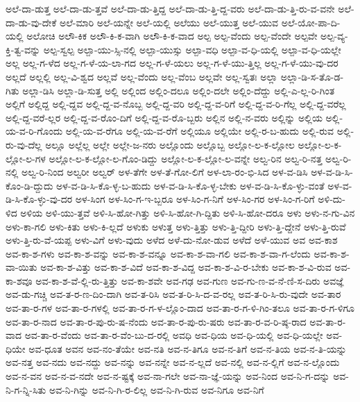 {ಅಲೆ-ದಾ-ಡುತ್ತ
ಅಲೆ-ದಾ-ಡು-ತ್ತವೆ
ಅಲೆ-ದಾ-ಡು-ತ್ತಿದ್ದ
ಅಲೆ-ದಾ-ಡು-ತ್ತಿ-ದ್ದ-ವರು
ಅಲೆ-ದಾ-ಡು-ತ್ತಿ-ರು-ವ-ವನೇ
ಅಲೆ-ದಾ-ಡು-ವು-ದೇಕೆ
ಅಲೆ-ಮಾರಿ
ಅಲೆ-ಯನ್ನೇ
ಅಲೆ-ಯಲ್ಲಿ
ಅಲೆಯು
ಅಲೆ-ಯುತ್ತ
ಅಲೆ-ಯುವ
ಅಲೆ-ಯೋ-ಪಾ-ದಿ-ಯಲ್ಲಿ
ಅಲೋಚಿ
ಅಲೌ-ಕಿಕ
ಅಲೌ-ಕಿ-ಕ-ವಾಗಿ
ಅಲೌ-ಕಿ-ಕ-ವಾದ
ಅಲ್ಪ
ಅಲ್ಪ-ವೆಂದು
ಅಲ್ಪ-ವೆಂದೇ
ಅಲ್ಪವೇ
ಅಲ್ಪ-ವ್ಯ-ಕ್ತಿ-ತ್ವ-ವನ್ನು
ಅಲ್ಪ-ಸ್ವಲ್ಪ
ಅಲ್ಪಾ-ಯು-ಸ್ಸಿ-ನಲ್ಲಿ
ಅಲ್ಪಾ-ಯುಸ್ಸು
ಅಲ್ಪಾ-ವಧಿ
ಅಲ್ಪಾ-ವ-ಧಿ-ಯಲ್ಲಿ
ಅಲ್ಪಾ-ವ-ಧಿ-ಯಲ್ಲೇ
ಅಲ್ಲ
ಅಲ್ಲ-ಗ-ಳೆದ
ಅಲ್ಲ-ಗ-ಳೆ-ಯ-ಲಾ-ಗದ
ಅಲ್ಲ-ಗ-ಳೆ-ಯಲು
ಅಲ್ಲ-ಗ-ಳೆ-ಯು-ತ್ತಿಲ್ಲ
ಅಲ್ಲ-ಗ-ಳೆ-ಯು-ವು-ದರ
ಅಲ್ಲದೆ
ಅಲ್ಲಲ್ಲಿ
ಅಲ್ಲ-ವಿ-ಶ್ವದ
ಅಲ್ಲವೆ
ಅಲ್ಲ-ವೆಂದು
ಅಲ್ಲ-ವೆಂಬ
ಅಲ್ಲವೇ
ಅಲ್ಲ-ಸ್ವತಃ
ಅಲ್ಲಾ
ಅಲ್ಲಾ-ಡಿ-ಸ-ತೊ-ಡ-ಗಿತು
ಅಲ್ಲಾ-ಡಿಸಿ
ಅಲ್ಲಾ-ಡಿ-ಸುತ್ತ
ಅಲ್ಲಿ
ಅಲ್ಲಿಂದ
ಅಲ್ಲಿಂ-ದಲೂ
ಅಲ್ಲಿಂ-ದಲೇ
ಅಲ್ಲಿಂ-ದೆದ್ದು
ಅಲ್ಲಿ-ಎ-ಲ್ಲ-ರಿ-ಗಿಂತ
ಅಲ್ಲಿಗೆ
ಅಲ್ಲಿದ್ದ
ಅಲ್ಲಿ-ದ್ದವ
ಅಲ್ಲಿ-ದ್ದ-ವ-ನೊಬ್ಬ
ಅಲ್ಲಿ-ದ್ದ-ವರಿ
ಅಲ್ಲಿ-ದ್ದ-ವ-ರಿಗೆ
ಅಲ್ಲಿ-ದ್ದ-ವ-ರಿ-ಗೆಲ್ಲ
ಅಲ್ಲಿ-ದ್ದ-ವರೆಲ್ಲ
ಅಲ್ಲಿ-ದ್ದ-ವರೆ-ಲ್ಲರ
ಅಲ್ಲಿ-ದ್ದ-ವ-ರೊಂ-ದಿಗೆ
ಅಲ್ಲಿ-ದ್ದ-ವ-ರೊ-ಬ್ಬರು
ಅಲ್ಲಿನ
ಅಲ್ಲಿ-ನ-ವರು
ಅಲ್ಲಿನ್ನು
ಅಲ್ಲಿಯ
ಅಲ್ಲಿ-ಯ-ವ-ರಿ-ಗೊಂದು
ಅಲ್ಲಿ-ಯ-ವ-ರೆಗೂ
ಅಲ್ಲಿ-ಯ-ವ-ರೆಗೆ
ಅಲ್ಲಿಯೂ
ಅಲ್ಲಿಯೇ
ಅಲ್ಲಿ-ರ-ಬ-ಹುದು
ಅಲ್ಲಿ-ರುವ
ಅಲ್ಲಿ-ರು-ವು-ದೆಲ್ಲ
ಅಲ್ಲೂ
ಅಲ್ಲೆಲ್ಲ
ಅಲ್ಲೇ
ಅಲ್ಲೇ-ಜ-ನರು
ಅಲ್ಲೊಂದು
ಅಲ್ಲೊಬ್ಬ
ಅಲ್ಲೋ-ಲ-ಕ-ಲ್ಲೋಲ
ಅಲ್ಲೋ-ಲ-ಕ-ಲ್ಲೋ-ಲ-ಗಳ
ಅಲ್ಲೋ-ಲ-ಕ-ಲ್ಲೋ-ಲ-ಗೊಂ-ಡಿದ್ದು
ಅಲ್ಲೋ-ಲ-ಕ-ಲ್ಲೋ-ಲ-ವನ್ನೇ
ಅಲ್ವ-ರಿನ
ಅಲ್ವ-ರಿ-ನತ್ತ
ಅಲ್ವ-ರಿ-ನಲ್ಲಿ
ಅಲ್ವ-ರಿ-ನಿಂದ
ಅಲ್ವರೀ
ಅಲ್ವರ್
ಅಳ-ತೆಗೇ
ಅಳ-ತೆ-ಗೋ-ಲಿಗೆ
ಅಳ-ಲಾ-ರಂ-ಭಿ-ಸಿದ
ಅಳ-ವ-ಡಿಸಿ
ಅಳ-ವ-ಡಿ-ಸಿ-ಕೊಂ-ಡಿ-ದ್ದುದು
ಅಳ-ವ-ಡಿ-ಸಿ-ಕೊ-ಳ್ಳ-ಬ-ಹುದು
ಅಳ-ವ-ಡಿ-ಸಿ-ಕೊ-ಳ್ಳ-ಬೇಕು
ಅಳ-ವ-ಡಿ-ಸಿ-ಕೊ-ಳ್ಳು-ವಂತೆ
ಅಳ-ವ-ಡಿ-ಸಿ-ಕೊ-ಳ್ಳು-ವು-ದರ
ಅಳ-ಸಿಂಗ
ಅಳ-ಸಿಂ-ಗ-ಇ-ಬ್ಬರೂ
ಅಳ-ಸಿಂ-ಗ-ನಿಗೆ
ಅಳ-ಸಿಂ-ಗರ
ಅಳ-ಸಿಂ-ಗ-ರಿಗೆ
ಅಳಿ-ದು-ಳಿದ
ಅಳಿಯ
ಅಳಿ-ಯು-ತ್ತವೆ
ಅಳಿ-ಸಿ-ಹೋ-ಗಿತ್ತು
ಅಳಿ-ಸಿ-ಹೋ-ಗಿ-ದ್ದಿತು
ಅಳಿ-ಸಿ-ಹೋ-ದರೂ
ಅಳು
ಅಳು-ನ-ಗು-ವಿನ
ಅಳು-ಕಾ-ಗಲಿ
ಅಳು-ಕಿತು
ಅಳು-ಕಿ-ಲ್ಲದೆ
ಅಳುಕು
ಅಳುತ್ತ
ಅಳು-ತ್ತಿತ್ತು
ಅಳು-ತ್ತಿ-ದ್ದೀರಿ
ಅಳು-ತ್ತಿ-ದ್ದೇನೆ
ಅಳು-ತ್ತಿ-ರುವೆ
ಅಳು-ತ್ತಿ-ರು-ವೆ-ಯಪ್ಪ
ಅಳು-ವಿಗೆ
ಅಳು-ವುದು
ಅಳೆದ
ಅಳೆ-ದು-ನೋ-ಡುವ
ಅಳೆದೆ
ಅಳೆ-ಯುವ
ಅವ
ಅವ-ಕಾಶ
ಅವ-ಕಾ-ಶ-ಗಳು
ಅವ-ಕಾ-ಶ-ವನ್ನು
ಅವ-ಕಾ-ಶ-ವನ್ನೂ
ಅವ-ಕಾ-ಶ-ವಾ-ಗಲಿ
ಅವ-ಕಾ-ಶ-ವಾ-ಗ-ಲೆಂದು
ಅವ-ಕಾ-ಶ-ವಾ-ಯಿತು
ಅವ-ಕಾ-ಶ-ವಿತ್ತು
ಅವ-ಕಾ-ಶ-ವಿದೆ
ಅವ-ಕಾ-ಶ-ವಿದ್ದ
ಅವ-ಕಾ-ಶ-ವಿ-ರ-ಬೇಕು
ಅವ-ಕಾ-ಶ-ವಿ-ರುವ
ಅವ-ಕಾ-ಶವೂ
ಅವ-ಕಾ-ಶ-ವೆ-ಲ್ಲಿ-ರು-ತ್ತಿತ್ತು
ಅವ-ಕಾ-ಶವೇ
ಅವ-ಗಢ
ಅವ-ಗುಣ
ಅವ-ಗು-ಣ-ವ-ನೆ-ಣಿ-ಸ-ದಿರು
ಅವಜ್ಞೆ
ಅವ-ಡು-ಗಚ್ಚಿ
ಅವ-ತ-ರ-ಣ-ದಿಂ-ದಾಗಿ
ಅವ-ತ-ರಿಸಿ
ಅವ-ತ-ರಿ-ಸಿ-ದ-ವ-ರಲ್ಲ
ಅವ-ತ-ರಿ-ಸಿ-ರು-ವುದೇ
ಅವ-ತಾರ
ಅವ-ತಾ-ರ-ಗಳ
ಅವ-ತಾ-ರ-ಗಳಲ್ಲಿ
ಅವ-ತಾ-ರ-ಗ-ಳ-ಲ್ಲೊಂ-ದಾದ
ಅವ-ತಾ-ರ-ಗ-ಳಿ-ಗಿಂ-ತಲೂ
ಅವ-ತಾ-ರ-ಗ-ಳಿಗೂ
ಅವ-ತಾ-ರ-ನಾದ
ಅವ-ತಾ-ರ-ಪು-ರು-ಷ-ನೆಂದು
ಅವ-ತಾ-ರ-ಪು-ರು-ಷರು
ಅವ-ತಾ-ರ-ವ-ರಿ-ಷ್ಠ-ರಾದ
ಅವ-ತಾ-ರ-ವಾದ
ಅವ-ತಾ-ರ-ವೆಂದು
ಅವ-ತಾ-ರ-ವೆಂ-ಬು-ದ-ರಲ್ಲಿ
ಅವಧಿ
ಅವ-ಧಿಯ
ಅವ-ಧಿ-ಯಲ್ಲಿ
ಅವ-ಧಿ-ಯಲ್ಲೇ
ಅವ-ಧಿಯೇ
ಅವ-ಧೂತ
ಅವನ
ಅವ-ನಂ-ತೆಯೇ
ಅವ-ನತಿ
ಅವ-ನ-ತಿಗೂ
ಅವ-ನ-ತಿಗೆ
ಅವ-ನ-ತಿಯ
ಅವ-ನ-ತಿ-ಯನ್ನು
ಅವ-ನತ್ತ
ಅವ-ನದು
ಅವ-ನದ್ದು
ಅವ-ನನ್ನು
ಅವ-ನನ್ನೇ
ಅವ-ನ-ಲ್ಲದೆ
ಅವ-ನಲ್ಲಿ
ಅವ-ನ-ಲ್ಲಿಗೆ
ಅವ-ನ-ಲ್ಲೊಂದು
ಅವ-ನ-ವನ
ಅವ-ನ-ವ-ನದೇ
ಅವ-ನ-ಷ್ಟಕ್ಕೆ
ಅವ-ನಾ-ಗಲೇ
ಅವ-ನಾ-ಜ್ಞೆ-ಯನ್ನು
ಅವ-ನಿಂದ
ಅವ-ನಿ-ಗ-ದನ್ನು
ಅವ-ನಿ-ಗ-ನ್ನಿ-ಸಿತು
ಅವ-ನಿ-ಗಿನ್ನು
ಅವ-ನಿ-ಗಿ-ರ-ಲಿಲ್ಲ
ಅವ-ನಿ-ಗಿ-ರುವ
ಅವ-ನಿಗೂ
ಅವ-ನಿಗೆ
}
